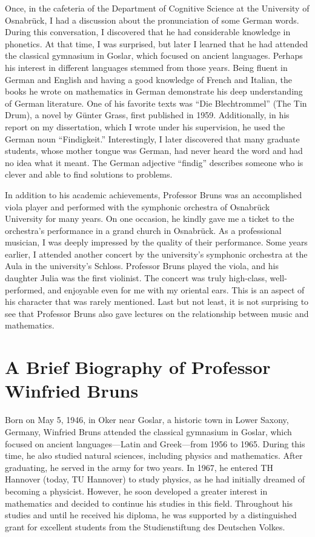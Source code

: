 \documentclass[10pt]{amsart}
\begin{document}
	Once, in the cafeteria of the Department of Cognitive Science at the University of Osnabr\"{u}ck, I had a discussion about the pronunciation of some German words. During this conversation, I discovered that he had considerable knowledge in phonetics. At that time, I was surprised, but later I learned that he had attended the classical gymnasium in Goslar, which focused on ancient languages. Perhaps his interest in different languages stemmed from those years. Being fluent in German and English and having a good knowledge of French and Italian, the books he wrote on mathematics in German demonstrate his deep understanding of German literature. One of his favorite texts was ``Die Blechtrommel'' (The Tin Drum), a novel by G\"{u}nter Grass, first published in 1959. Additionally, in his report on my dissertation, which I wrote under his supervision, he used the German noun ``Findigkeit.'' Interestingly, I later discovered that many graduate students, whose mother tongue was German, had never heard the word and had no idea what it meant. The German adjective ``findig'' describes someone who is clever and able to find solutions to problems.

	In addition to his academic achievements, Professor Bruns was an accomplished viola player and performed with the symphonic orchestra of Osnabr\"{u}ck University for many years. On one occasion, he kindly gave me a ticket to the orchestra's performance in a grand church in Osnabr\"{u}ck. As a professional musician, I was deeply impressed by the quality of their performance. Some years earlier, I attended another concert by the university's symphonic orchestra at the Aula in the university's Schloss. Professor Bruns played the viola, and his daughter Julia was the first violinist. The concert was truly high-class, well-performed, and enjoyable even for me with my oriental ears. This is an aspect of his character that was rarely mentioned. Last but not least, it is not surprising to see that Professor Bruns also gave lectures on the relationship between music and mathematics.
	
	\section*{A Brief Biography of Professor Winfried Bruns}
	
	Born on May 5, 1946, in Oker near Goslar, a historic town in Lower Saxony, Germany, Winfried Bruns attended the classical gymnasium in Goslar, which focused on ancient languages---Latin and Greek---from 1956 to 1965. During this time, he also studied natural sciences, including physics and mathematics. After graduating, he served in the army for two years. In 1967, he entered TH Hannover (today, TU Hannover) to study physics, as he had initially dreamed of becoming a physicist. However, he soon developed a greater interest in mathematics and decided to continue his studies in this field. Throughout his studies and until he received his diploma, he was supported by a distinguished grant for excellent students from the Studienstiftung des Deutschen Volkes.
	
\end{document}
